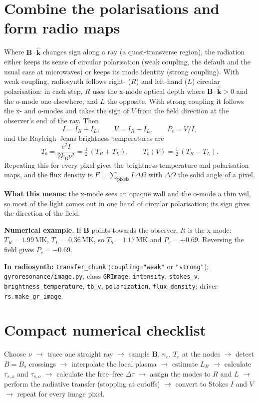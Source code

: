 \documentclass[11pt,a4paper]{article}
\newcommand{\vect}[1]{\bm{#1}}
\newcommand{\kB}{k_\mathrm{B}}
\newcommand{\code}[1]{\texttt{#1}}
\newcommand{\example}[1]{\par\noindent\colorbox{boxbg}{\parbox{\dimexpr\linewidth-2\fboxsep}{\small\textbf{Numerical example.} #1}}\par}
\newcommand{\whatitmeans}[1]{\par{\color{head}\textbf{What this means:}} #1\par}
\newcommand{\incode}[1]{\par{\small\color{head!80!black}\textbf{In radiosynth:} #1}\par}
\begin{document}
\section{Combine the polarisations and form radio maps}
Where $\vect B\cdot\hat{\vect k}$ changes sign along a ray (a quasi-transverse region), the radiation either keeps
its sense of circular polarisation (weak coupling, the default and the usual case at
microwaves) or keeps its mode identity (strong coupling). With weak coupling, radiosynth follows
right- ($R$) and left-hand ($L$) circular polarisation: in each step, $R$ uses the x-mode optical depth
where $\vect B\cdot\hat{\vect k}>0$ and the o-mode one elsewhere, and $L$ the opposite. With strong coupling it
follows the x- and o-modes and takes the sign of $V$ from the field direction at the observer's
end of the ray. Then
\begin{equation}
  I=I_R+I_L,\qquad V=I_R-I_L,\qquad P_c=V/I,
\end{equation}
and the Rayleigh--Jeans brightness temperatures are
\begin{equation}
  T_b=\frac{c^2I}{2\kB\nu^2}=\tfrac12\,(T_R+T_L),\qquad T_b(V)=\tfrac12\,(T_R-T_L).
\end{equation}
Repeating this for every pixel gives the brightness-temperature and polarisation maps, and the
flux density is $F=\sum_\text{pixels}I\,\Delta\Omega$ with $\Delta\Omega$ the solid angle of a pixel.
\whatitmeans{the x-mode sees an opaque wall and the o-mode a thin veil, so most of the light comes out in
one hand of circular polarisation; its sign gives the direction of the field.}
\example{If $\vect B$ points towards the observer, $R$ is the x-mode: $T_R=1.99$\,MK, $T_L=0.36$\,MK, so
$T_b=1.17$\,MK and $P_c=+0.69$. Reversing the field gives $P_c=-0.69$.}
\incode{\code{transfer\_chunk} (\code{coupling="weak"} or \code{"strong"}); \code{gyroresonance/image.py},
class \code{GRImage}: \code{intensity}, \code{stokes\_v}, \code{brightness\_temperature},
\code{tb\_v}, \code{polarization}, \code{flux\_density}; driver \code{rs.make\_gr\_image}.}

\section{Compact numerical checklist}
Choose $\nu$ $\rightarrow$ trace one straight ray $\rightarrow$ sample $\vect B$, $n_e$, $T_e$ at the nodes $\rightarrow$
detect $B=B_s$ crossings $\rightarrow$ interpolate the local plasma $\rightarrow$ estimate $L_B$ $\rightarrow$ calculate
$\tau_{s,x}$ and $\tau_{s,o}$ $\rightarrow$ calculate the free--free $\Delta\tau$ $\rightarrow$ assign the modes to $R$ and $L$ $\rightarrow$
perform the radiative transfer (stopping at cutoffs) $\rightarrow$ convert to Stokes $I$ and $V$ $\rightarrow$
repeat for every image pixel.
\end{document}
